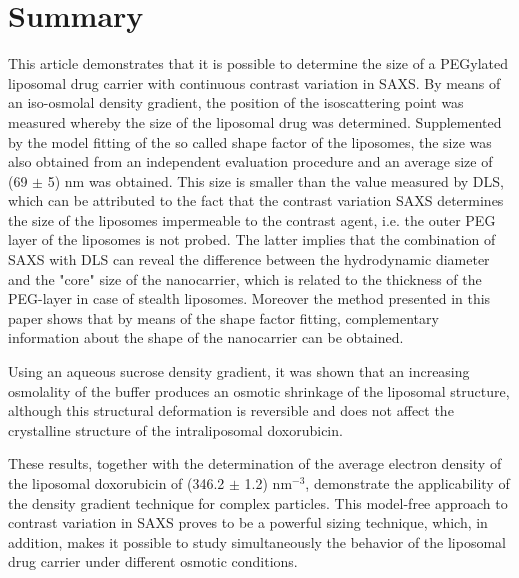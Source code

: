 \section{Summary}
This article demonstrates that it is possible to determine the size of a PEGylated liposomal drug carrier with continuous contrast variation in SAXS. By means of an iso-osmolal density gradient, the position of the isoscattering point was measured whereby the size of the liposomal drug was determined. Supplemented by the model fitting of the so called shape factor of the liposomes, the size was also obtained from an independent evaluation procedure and an average size of (69 $\pm$ 5) nm was obtained. This size is smaller than the value measured by DLS, which can be attributed to the fact that the contrast variation SAXS determines the size of the liposomes impermeable to the contrast agent, i.e. the outer PEG layer of the liposomes is not probed. The latter implies that the combination of SAXS with DLS can reveal the difference between the hydrodynamic diameter and the "core" size of the nanocarrier, which is related to the thickness of the PEG-layer in case of stealth liposomes. Moreover the method presented in this paper shows that by means of the shape factor fitting, complementary information about the shape of the nanocarrier can be obtained.

Using an aqueous sucrose density gradient, it was shown that an increasing osmolality of the buffer produces an osmotic shrinkage of the liposomal structure, although this structural deformation is reversible and does not affect the crystalline structure of the intraliposomal doxorubicin.

These results, together with the determination of the average electron density of the liposomal doxorubicin of (346.2 $\pm$ 1.2) nm$^{-3}$, demonstrate the applicability of the density gradient technique for complex particles. This model-free approach to contrast variation in SAXS proves to be a powerful sizing technique, which, in addition, makes it possible to study simultaneously the behavior of the liposomal drug carrier under different osmotic conditions.

